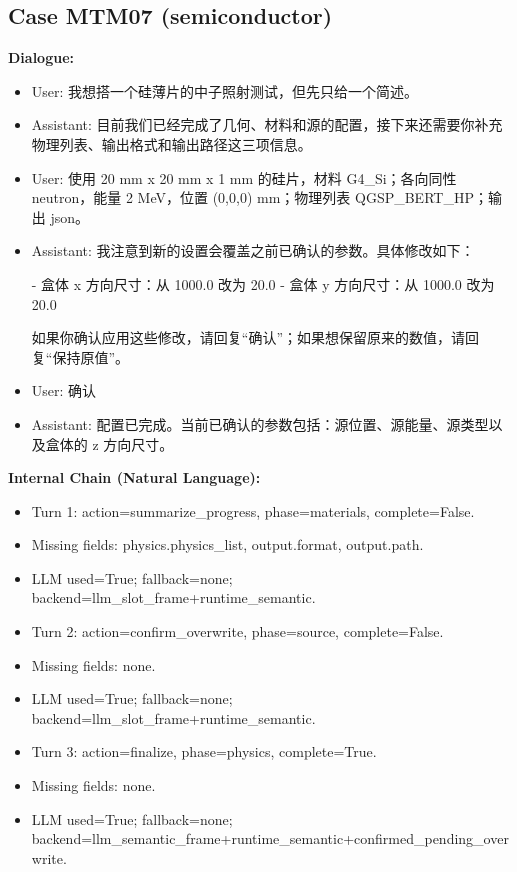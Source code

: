 \documentclass[11pt]{ctexart}
\begin{document}
\subsection{Case MTM07 (semiconductor)}
\textbf{Dialogue:}
\begin{itemize}
\item User: 我想搭一个硅薄片的中子照射测试，但先只给一个简述。
\item Assistant: 目前我们已经完成了几何、材料和源的配置，接下来还需要你补充物理列表、输出格式和输出路径这三项信息。
\item User: 使用 20 mm x 20 mm x 1 mm 的硅片，材料 G4\_Si；各向同性 neutron，能量 2 MeV，位置 (0,0,0) mm；物理列表 QGSP\_BERT\_HP；输出 json。
\item Assistant: 我注意到新的设置会覆盖之前已确认的参数。具体修改如下：

- 盒体 x 方向尺寸：从 1000.0 改为 20.0
- 盒体 y 方向尺寸：从 1000.0 改为 20.0

如果你确认应用这些修改，请回复“确认”；如果想保留原来的数值，请回复“保持原值”。
\item User: 确认
\item Assistant: 配置已完成。当前已确认的参数包括：源位置、源能量、源类型以及盒体的 z 方向尺寸。
\end{itemize}
\textbf{Internal Chain (Natural Language):}
\begin{itemize}
\item Turn 1: action=summarize\_progress, phase=materials, complete=False.
\item Missing fields: physics.physics\_list, output.format, output.path.
\item LLM used=True; fallback=none; backend=llm\_slot\_frame+runtime\_semantic.
\item Turn 2: action=confirm\_overwrite, phase=source, complete=False.
\item Missing fields: none.
\item LLM used=True; fallback=none; backend=llm\_slot\_frame+runtime\_semantic.
\item Turn 3: action=finalize, phase=physics, complete=True.
\item Missing fields: none.
\item LLM used=True; fallback=none; backend=llm\_semantic\_frame+runtime\_semantic+confirmed\_pending\_overwrite.
\end{itemize}
\end{document}
